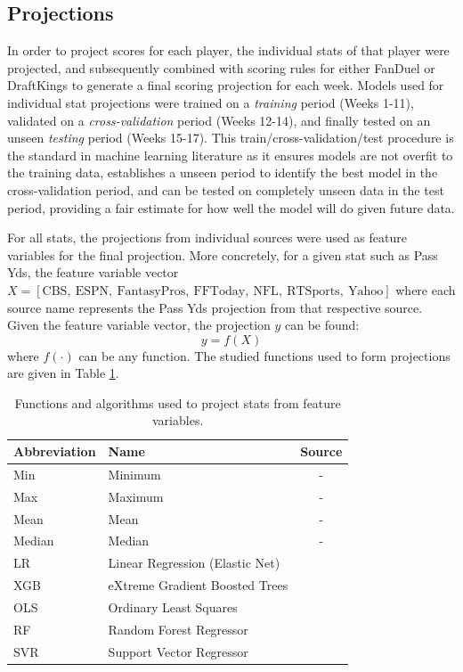 \documentclass[12pt]{article}
\begin{document}
\subsection{Projections}
In order to project scores for each player, the individual stats of that player were projected, and subsequently combined with scoring rules for either FanDuel or DraftKings to generate a final scoring projection for each week. Models used for individual stat projections were trained on a \textit{training} period (Weeks 1-11), validated on a \textit{cross-validation} period (Weeks 12-14), and finally tested on an unseen \textit{testing} period (Weeks 15-17). This train/cross-validation/test procedure is the standard in machine learning literature as it ensures models are not overfit to the training data, establishes a unseen period to identify the best model in the cross-validation period, and can be tested on completely unseen data in the test period, providing a fair estimate for how well the model will do given future data.\bigskip

For all stats, the projections from individual sources were used as feature variables for the final projection. More concretely, for a given stat such as Pass Yds, the feature variable vector $X = [\text{CBS},\ \text{ESPN},\ \text{FantasyPros},\ \text{FFToday},\ \text{NFL},\ \text{RTSports},\ \text{Yahoo}]$ where each source name represents the Pass Yds projection from that respective source. Given the feature variable vector, the projection $y$ can be found:
\begin{equation}
y = f(X)
\end{equation}
where $f(\cdot)$ can be any function. The studied functions used to form projections are given in Table \ref{ML algos}.

\begin{table}[H]
\caption{Functions and algorithms used to project stats from feature variables.}
\label{ML algos}
\centering
\begin{tabular}{llc}
	\toprule
	Abbreviation        &  Name           &  Source \\
	\midrule
	Min		& Minimum		& -\\
	Max		& Maximum		& -\\
	Mean		& Mean		& -\\
	Median		& Median		& -\\
	LR  & Linear Regression (Elastic Net)  & \cite{LR paper, LR algo}\\
	XGB & eXtreme Gradient Boosted Trees  & \cite{XGB paper, XGB algo}\\
	OLS & Ordinary Least Squares  & \cite{OLS algo}\\
	RF & Random Forest Regressor & \cite{RF paper, RF algo}\\
	SVR & Support Vector Regressor  & \cite{SVR paper, SVR algo}\\
	\bottomrule
\end{tabular}
\end{table}
\end{document}
